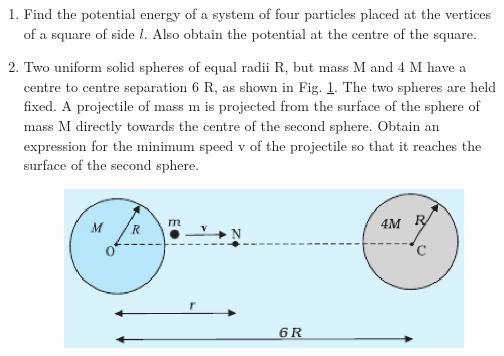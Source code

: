 \begin{enumerate}[label=\arabic*.,ref=\thesubsection.\theenumi]
\item Find the potential energy of a system of four particles placed at the vertices of a square of side $l$. Also obtain the potential at the centre of the square.
\item Two uniform solid spheres of equal radii R, but mass M and 4 M have a centre to centre separation 6 R, as shown in Fig. \ref{fig:8.10}. The two spheres are held fixed. A projectile of mass m is projected from the surface of the sphere of mass M directly towards the centre of the second sphere. Obtain an expression for the minimum speed v of the projectile so that it reaches the surface of the second sphere.
\begin{figure}[!ht]
\includegraphics[width=\columnwidth]{./figs/11-1/8/8.10.eps}
\caption{}
\label{fig:8.10}
\end{figure}
\end{enumerate}

